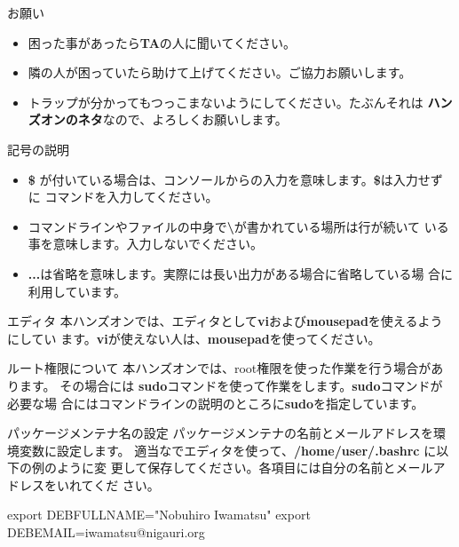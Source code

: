 \begin{frame}{お願い}
\begin{itemize}
\item 困った事があったら{\bf TA}の人に聞いてください。
\item 隣の人が困っていたら助けて上げてください。ご協力お願いします。
\item トラップが分かってもつっこまないようにしてください。たぶんそれは
      {\bf ハンズオンのネタ}なので、よろしくお願いします。
\end{itemize}
\end{frame}


\begin{frame}{記号の説明}

\begin{itemize}
\item {\bf \$} が付いている場合は、コンソールからの入力を意味します。{\bf \$}は入力せずに
コマンドを入力してください。

\item コマンドラインやファイルの中身で{\bf \textbackslash}が書かれている場所は行が続いて
いる事を意味します。入力しないでください。 

\item {\bf ...}は省略を意味します。実際には長い出力がある場合に省略している場
合に利用しています。
\end{itemize}

\end{frame}


\begin{frame}{エディタ}
本ハンズオンでは、エディタとして{\bf vi}および{\bf mousepad}を使えるようにしてい
ます。{\bf vi}が使えない人は、{\bf mousepad}を使ってください。
\end{frame}

\begin{frame}{ルート権限について}
本ハンズオンでは、root権限を使った作業を行う場合があります。
その場合には {\bf sudo}コマンドを使って作業をします。{\bf sudo}コマンドが必要な場
合にはコマンドラインの説明のところに{\bf sudo}を指定しています。
\end{frame}

 
\begin{frame}[containsverbatim]{パッケージメンテナ名の設定}
パッケージメンテナの名前とメールアドレスを環境変数に設定します。
適当なでエディタを使って、{\bf /home/user/.bashrc} に以下の例のように変
更して保存してください。各項目には自分の名前とメールアドレスをいれてくだ
さい。
\begin{commandline}
export DEBFULLNAME="Nobuhiro Iwamatsu"
export DEBEMAIL=iwamatsu@nigauri.org
\end{commandline}
\end{frame}


